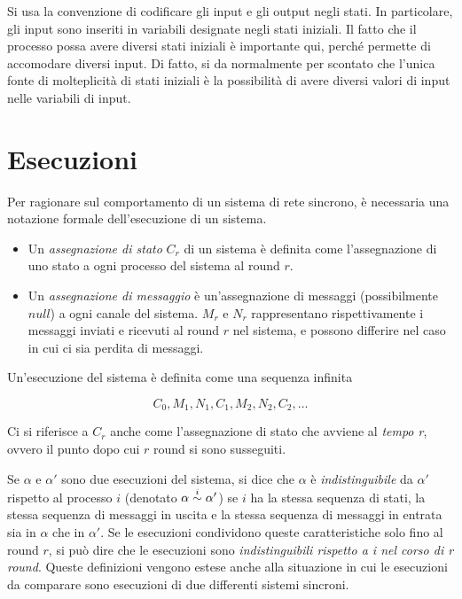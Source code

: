\documentclass[italian,]{book}
\providecommand{\tightlist}{%
  \setlength{\itemsep}{0pt}\setlength{\parskip}{0pt}}
\begin{document}
Si usa la convenzione di codificare gli input e gli output negli stati.
In particolare, gli input sono inseriti in variabili designate negli
stati iniziali. Il fatto che il processo possa avere diversi stati
iniziali è importante qui, perché permette di accomodare diversi input.
Di fatto, si da normalmente per scontato che l'unica fonte di
molteplicità di stati iniziali è la possibilità di avere diversi valori
di input nelle variabili di input.

\hypertarget{esecuzioni}{%
\section{Esecuzioni}\label{esecuzioni}}

Per ragionare sul comportamento di un sistema di rete sincrono, è
necessaria una notazione formale dell'esecuzione di un sistema.

\begin{itemize}
\tightlist
\item
  Un \emph{assegnazione di stato} \(C_r\) di un sistema è definita come
  l'assegnazione di uno stato a ogni processo del sistema al round
  \(r\).
\item
  Un \emph{assegnazione di messaggio} è un'assegnazione di messaggi
  (possibilmente \(null\)) a ogni canale del sistema. \(M_r\) e \(N_r\)
  rappresentano rispettivamente i messaggi inviati e ricevuti al round
  \(r\) nel sistema, e possono differire nel caso in cui ci sia perdita
  di messaggi.
\end{itemize}

Un'esecuzione del sistema è definita come una sequenza infinita

\[C_0,M_1,N_1,C_1,M_2,N_2,C_2,\ldots\]

Ci si riferisce a \(C_r\) anche come l'assegnazione di stato che avviene
al \emph{tempo r}, ovvero il punto dopo cui \(r\) round si sono
susseguiti.

Se \(\alpha\) e \(\alpha'\) sono due esecuzioni del sistema, si dice che
\(\alpha\) è \emph{indistinguibile} da \(\alpha'\) rispetto al processo
\(i\) (denotato \(\alpha \overset{i}{\sim} \alpha'\)) se \(i\) ha la stessa
sequenza di stati, la stessa sequenza di messaggi in uscita e la stessa
sequenza di messaggi in entrata sia in \(\alpha\) che in \(\alpha'\). Se
le esecuzioni condividono queste caratteristiche solo fino al round
\(r\), si può dire che le esecuzioni sono \emph{indistinguibili rispetto
a i nel corso di r round}. Queste definizioni vengono estese anche alla
situazione in cui le esecuzioni da comparare sono esecuzioni di due
differenti sistemi sincroni.
\end{document}
